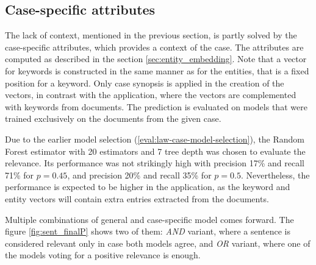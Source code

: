 \documentclass[
  digital, %
  notable,   %
  nolof,     %
  nolot,     %
  draft
]{fithesis3}
\begin{document}
\subsection{Case-specific attributes}
The lack of context, mentioned in the previous section, is partly solved by the case-specific attributes, which provides a context of the case.
The attributes are computed as described in the section \ref{sec:entity_embedding}.
Note that a vector for keywords is constructed in the same manner as for the entities, that is a fixed position for a keyword.
Only case synopsis is applied in the creation of the vectors, in contrast with the application, where the vectors are complemented with keywords from documents.
The prediction is evaluated on models that were trained exclusively on the documents from the given case.

Due to the earlier model selection (\ref{eval:law-case-model-selection}), the Random Forest estimator with 20 estimators and 7 tree depth was chosen to evaluate the relevance.
Its performance was not strikingly high with precision 17\% and recall 71\% for $p=0.45$, and precision 20\% and recall 35\% for $p=0.5$.
Nevertheless, the performance is expected to be higher in the application, as the keyword and entity vectors will contain extra entries extracted from the documents.

Multiple combinations of general and case-specific model comes forward.
The figure \ref{fig:sent_finalP} shows two of them: \textit{AND} variant, where a sentence is considered relevant only in case both models agree, and \textit{OR} variant, where one of the models voting for a positive relevance is enough.
\end{document}
